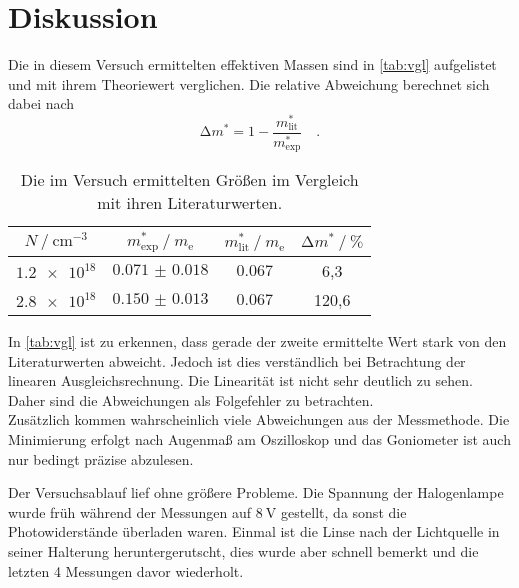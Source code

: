 \newpage
\section{Diskussion}

\noindent Die in diesem Versuch ermittelten effektiven Massen sind in \autoref{tab:vgl} aufgelistet und mit ihrem Theoriewert verglichen. 
Die relative Abweichung berechnet sich dabei nach
\begin{equation*}
    \increment m^* = 1 - \frac{m^*_\text{lit}}{m^*_\text{exp}} \quad .
\end{equation*}

\begin{table}
    \centering
    \caption{Die im Versuch ermittelten Größen im Vergleich mit ihren Literaturwerten.}
    \label{tab:vgl}
    \begin{tabular}{c c c c}
        \toprule
        {$N \mathbin{/} \si{\centi\metre\tothe{-3}}$} & {$m^*_\text{exp} \mathbin{/} m_\text{e}$} & {$m^*_\text{lit} \mathbin{/} m_\text{e}$ \protect \cite{effmasse}} & {$\increment m^* \mathbin{/} \si{\percent}$}\\ 
        \midrule
        $\num{1.2e18}$ & $\num{0.071(18)}$ & $\num{0.067}$ & 6,3 \\
        $\num{2.8e18}$ & $\num{0.150(13)}$ & $\num{0.067}$ & 120,6 \\
        \bottomrule
    \end{tabular}
\end{table}

\noindent In \autoref{tab:vgl} ist zu erkennen, dass gerade der zweite ermittelte Wert stark von den Literaturwerten abweicht. Jedoch ist dies verständlich bei 
Betrachtung der linearen Ausgleichsrechnung. Die Linearität ist nicht sehr deutlich zu sehen. Daher sind die Abweichungen als Folgefehler zu betrachten. \\
Zusätzlich kommen wahrscheinlich viele Abweichungen aus der Messmethode. Die Minimierung erfolgt nach Augenmaß am Oszilloskop und das Goniometer ist auch nur 
bedingt präzise abzulesen.

\noindent Der Versuchsablauf lief ohne größere Probleme. Die Spannung der Halogenlampe wurde früh während der Messungen auf $\SI{8}{\volt}$ gestellt, da sonst die 
Photowiderstände überladen waren. Einmal ist die Linse nach der Lichtquelle in seiner Halterung heruntergerutscht, dies wurde aber schnell bemerkt und die 
letzten 4 Messungen davor wiederholt.
